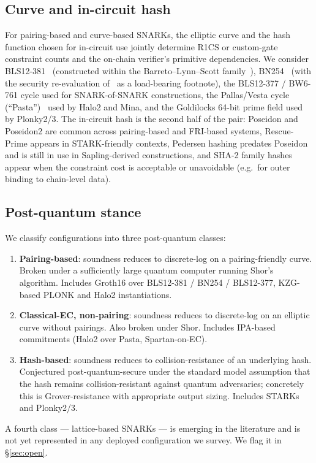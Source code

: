 \subsection{Curve and in-circuit hash}
\label{sec:dim-curve}

For pairing-based and curve-based SNARKs, the elliptic curve and the
hash function chosen for in-circuit use jointly determine R1CS or
custom-gate constraint counts and the on-chain verifier's primitive
dependencies. We consider BLS12-381~\cite{bowe-2017-bls12381}
(constructed within the Barreto--Lynn--Scott
family~\cite{barreto-2003-bls}),
BN254~\cite{barreto-2005-bn254} (with the security re-evaluation
of~\cite{kim-barbulescu-2016} as a load-bearing footnote), the
BLS12-377 / BW6-761 cycle used for SNARK-of-SNARK constructions, the
Pallas/Vesta cycle (``Pasta'')~\cite{hopwood-2020-pasta} used by Halo2
and Mina, and the Goldilocks 64-bit prime field used by Plonky2/3.
The in-circuit hash is the second half of the pair: Poseidon and
Poseidon2 are common across pairing-based and FRI-based systems,
Rescue-Prime appears in STARK-friendly contexts, Pedersen hashing
predates Poseidon and is still in use in Sapling-derived constructions,
and SHA-2 family hashes appear when the constraint cost is acceptable
or unavoidable (e.g.\ for outer binding to chain-level data).

\subsection{Post-quantum stance}
\label{sec:dim-pq}

We classify configurations into three post-quantum classes:
\begin{enumerate}
  \item \textbf{Pairing-based}: soundness reduces to discrete-log on a
    pairing-friendly curve. Broken under a sufficiently large quantum
    computer running Shor's algorithm. Includes Groth16 over
    BLS12-381 / BN254 / BLS12-377, KZG-based PLONK and Halo2
    instantiations.
  \item \textbf{Classical-EC, non-pairing}: soundness reduces to
    discrete-log on an elliptic curve without pairings. Also broken
    under Shor. Includes IPA-based commitments
    (Halo2 over Pasta, Spartan-on-EC).
  \item \textbf{Hash-based}: soundness reduces to collision-resistance
    of an underlying hash. Conjectured post-quantum-secure under the
    standard model assumption that the hash remains
    collision-resistant against quantum adversaries; concretely this
    is Grover-resistance with appropriate output sizing. Includes
    STARKs and Plonky2/3.
\end{enumerate}
A fourth class --- lattice-based SNARKs --- is emerging in the
literature and is not yet represented in any deployed configuration we
survey. We flag it in \S\ref{sec:open}.

